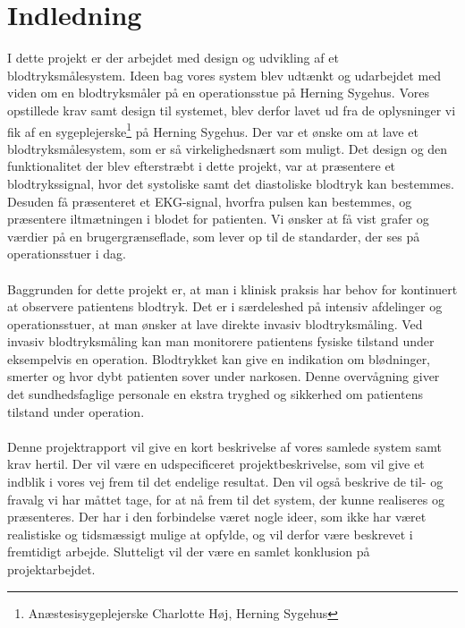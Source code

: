 \chapter{Indledning}
I dette projekt er der arbejdet med design og udvikling af et blodtryksmålesystem. Ideen bag vores system blev udtænkt og udarbejdet med viden om en blodtryksmåler på en operationsstue på Herning Sygehus. Vores opstillede krav samt design til systemet, blev derfor lavet ud fra de oplysninger vi fik af en sygeplejerske\footnote{Anæstesisygeplejerske Charlotte Høj, Herning Sygehus} på Herning Sygehus. Der var et ønske om at lave et blodtryksmålesystem, som er så virkelighedsnært som muligt. Det design og den funktionalitet der blev efterstræbt i dette projekt, var at præsentere et blodtrykssignal, hvor det systoliske samt det diastoliske blodtryk kan bestemmes. Desuden få præsenteret et EKG-signal, hvorfra pulsen kan bestemmes, og præsentere iltmætningen i blodet for patienten. Vi ønsker at få vist grafer og værdier på en brugergrænseflade, som lever op til de standarder, der ses på operationsstuer i dag. \\
\\
Baggrunden for dette projekt er, at man i klinisk praksis har behov for kontinuert at observere patientens blodtryk. Det er i særdeleshed på intensiv afdelinger og operationsstuer, at man ønsker at lave direkte invasiv blodtryksmåling. Ved invasiv blodtryksmåling kan man monitorere patientens fysiske tilstand under eksempelvis en operation. Blodtrykket kan give en indikation om blødninger, smerter og hvor dybt patienten sover under narkosen. Denne overvågning giver det sundhedsfaglige personale en ekstra tryghed og sikkerhed om patientens tilstand under operation. \\
\\
Denne projektrapport vil give en kort beskrivelse af vores samlede system samt krav hertil. Der vil være en udspecificeret projektbeskrivelse, som vil give et indblik i vores vej frem til det endelige resultat. Den vil også beskrive de til- og fravalg vi har måttet tage, for at nå frem til det system, der kunne realiseres og præsenteres. Der har i den forbindelse været nogle ideer, som ikke har været realistiske og tidsmæssigt mulige at opfylde, og vil derfor være beskrevet i fremtidigt arbejde. Slutteligt vil der være en samlet konklusion på projektarbejdet.
